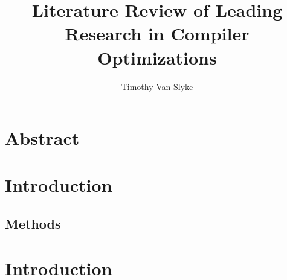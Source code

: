\documentclass[]{tufte-handout}
\title{Literature Review of Leading Research in Compiler Optimizations}
\author{Timothy Van Slyke}
\begin{document}
\maketitle
\section*{Abstract}
\begin{abstract}
\lipsum[1]
\end{abstract}


\section{Introduction}
\lipsum[1]


\subsection{Methods}
\lipsum[1]


\section{Introduction}
\lipsum[1]
\end{document}
